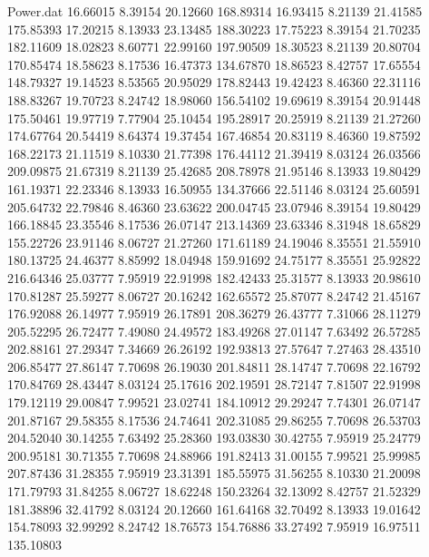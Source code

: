 \begin{filecontents}{Power.dat}
  16.66015    8.39154   20.12660  168.89314
  16.93415    8.21139   21.41585  175.85393
  17.20215    8.13933   23.13485  188.30223
  17.75223    8.39154   21.70235  182.11609
  18.02823    8.60771   22.99160  197.90509
  18.30523    8.21139   20.80704  170.85474
  18.58623    8.17536   16.47373  134.67870
  18.86523    8.42757   17.65554  148.79327
  19.14523    8.53565   20.95029  178.82443
  19.42423    8.46360   22.31116  188.83267
  19.70723    8.24742   18.98060  156.54102
  19.69619    8.39154   20.91448  175.50461
  19.97719    7.77904   25.10454  195.28917
  20.25919    8.21139   21.27260  174.67764
  20.54419    8.64374   19.37454  167.46854
  20.83119    8.46360   19.87592  168.22173
  21.11519    8.10330   21.77398  176.44112
  21.39419    8.03124   26.03566  209.09875
  21.67319    8.21139   25.42685  208.78978
  21.95146    8.13933   19.80429  161.19371
  22.23346    8.13933   16.50955  134.37666
  22.51146    8.03124   25.60591  205.64732
  22.79846    8.46360   23.63622  200.04745
  23.07946    8.39154   19.80429  166.18845
  23.35546    8.17536   26.07147  213.14369
  23.63346    8.31948   18.65829  155.22726
  23.91146    8.06727   21.27260  171.61189
  24.19046    8.35551   21.55910  180.13725
  24.46377    8.85992   18.04948  159.91692
  24.75177    8.35551   25.92822  216.64346
  25.03777    7.95919   22.91998  182.42433
  25.31577    8.13933   20.98610  170.81287
  25.59277    8.06727   20.16242  162.65572
  25.87077    8.24742   21.45167  176.92088
  26.14977    7.95919   26.17891  208.36279
  26.43777    7.31066   28.11279  205.52295
  26.72477    7.49080   24.49572  183.49268
  27.01147    7.63492   26.57285  202.88161
  27.29347    7.34669   26.26192  192.93813
  27.57647    7.27463   28.43510  206.85477
  27.86147    7.70698   26.19030  201.84811
  28.14747    7.70698   22.16792  170.84769
  28.43447    8.03124   25.17616  202.19591
  28.72147    7.81507   22.91998  179.12119
  29.00847    7.99521   23.02741  184.10912
  29.29247    7.74301   26.07147  201.87167
  29.58355    8.17536   24.74641  202.31085
  29.86255    7.70698   26.53703  204.52040
  30.14255    7.63492   25.28360  193.03830
  30.42755    7.95919   25.24779  200.95181
  30.71355    7.70698   24.88966  191.82413
  31.00155    7.99521   25.99985  207.87436
  31.28355    7.95919   23.31391  185.55975
  31.56255    8.10330   21.20098  171.79793
  31.84255    8.06727   18.62248  150.23264
  32.13092    8.42757   21.52329  181.38896
  32.41792    8.03124   20.12660  161.64168
  32.70492    8.13933   19.01642  154.78093
  32.99292    8.24742   18.76573  154.76886
  33.27492    7.95919   16.97511  135.10803

\end{filecontents}
